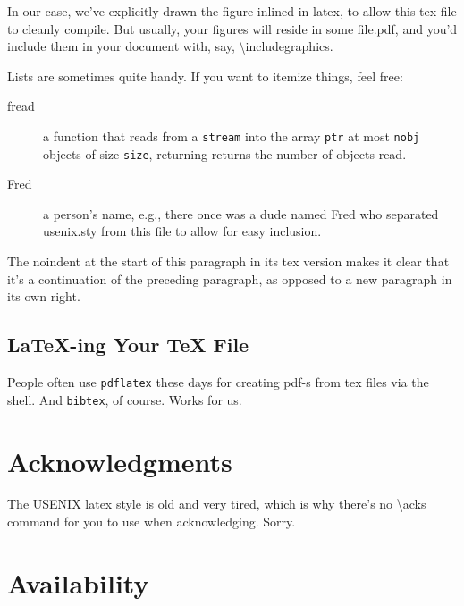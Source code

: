 In our case, we've explicitly drawn the figure inlined in latex, to
allow this tex file to cleanly compile. But usually, your figures will
reside in some file.pdf, and you'd include them in your document
with, say, \textbackslash{}includegraphics.

Lists are sometimes quite handy. If you want to itemize things, feel
free:

\begin{description}
  
\item[fread] a function that reads from a \texttt{stream} into the
  array \texttt{ptr} at most \texttt{nobj} objects of size
  \texttt{size}, returning returns the number of objects read.

\item[Fred] a person's name, e.g., there once was a dude named Fred
  who separated usenix.sty from this file to allow for easy
  inclusion.
\end{description}

\noindent
The noindent at the start of this paragraph in its tex version makes
it clear that it's a continuation of the preceding paragraph, as
opposed to a new paragraph in its own right.


\subsection{LaTeX-ing Your TeX File}

People often use \texttt{pdflatex} these days for creating pdf-s from
tex files via the shell. And \texttt{bibtex}, of course. Works for us.

\section*{Acknowledgments}

The USENIX latex style is old and very tired, which is why
there's no \textbackslash{}acks command for you to use when
acknowledging. Sorry.

\section*{Availability}

